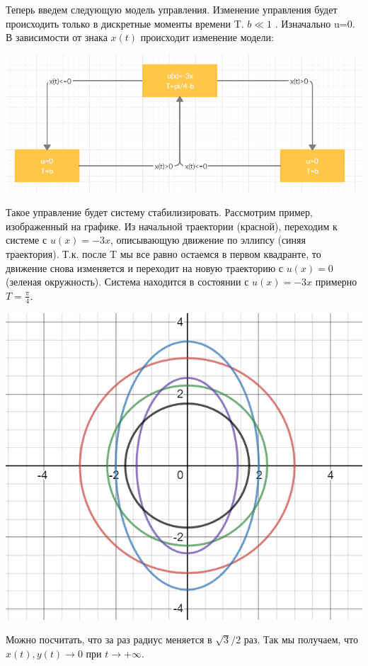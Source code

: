\documentclass[10pt]{report}
\begin{document}
Теперь введем следующую модель управления. Изменение управления будет происходить только в дискретные моменты времени T. $b\ll1$ . Изначально u=0. В зависимости от знака $x(t)$ происходит изменение модели:
\begin{center} 
{\includegraphics[scale=0.5]{graph14.1.png}} 
\end{center}
Такое управление будет систему стабилизировать. Рассмотрим пример, изображенный на графике. Из начальной траектории (красной), переходим к системе с $u(x)=-3x$, описывающую движение по эллипсу (синяя траектория). Т.к. после T мы все равно остаемся в первом квадранте, то движение снова изменяется и переходит на новую траекторию с  $u(x)=0$ (зеленая окружность). Система находится в состоянии с $u(x)=-3x$ примерно $T= \frac {\pi} 4$.
\begin{center} 
{\includegraphics[scale=0.5]{graph14.2.png}} 
\end{center}
Можно посчитать, что за раз радиус меняется в $\sqrt3/2$ раз. Так мы получаем, что  $x(t), y(t) \rightarrow 0$ при $t\rightarrow+\infty$.
\end{document}

